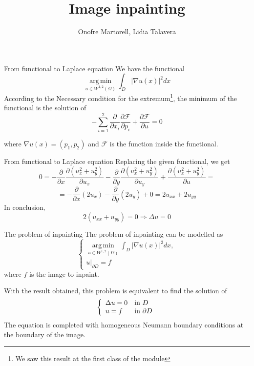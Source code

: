 \documentclass[11pt]{beamer}
\author{Onofre Martorell, Lidia Talavera}
\title{Image inpainting}
\DeclareMathOperator{\argmin}{\mathrm{arg\, min}}
\begin{document}
\begin{frame}
\titlepage
\end{frame}


\begin{frame}{From functional to Laplace equation}
We have the functional
$$
\displaystyle\argmin\limits_{u\in W^{1,2}(\Omega)}\int _D |\nabla u(x)|^2dx
$$
According to the Necessary condition for the extremum\footnote{We saw this result at the first class of the module}, the minimum of the functional is the solution of
$$-\sum_{i=1}^2 \frac{\partial}{\partial x_i}\frac{\partial\mathcal{F}}{\partial p_i} + \frac{\partial\mathcal{F}}{\partial u} = 0$$

where $\nabla u(x) = (p_1, p_2)$ and $\mathcal{F}$ is the function inside the functional.
\end{frame}

\begin{frame}{From functional to Laplace equation}
Replacing the given functional, we get
$$ 0 = - \frac{\partial}{\partial x}\frac{\partial(u_x^2 + u_y^2)}{\partial u_x} - \frac{\partial}{\partial y}\frac{\partial(u_x^2 + u_y^2)}{\partial u_y} + \frac{\partial(u_x^2 + u_y^2)}{\partial u} = $$
$$ = - \frac{\partial}{\partial x}(2u_x) - \frac{\partial}{\partial y}(2u_y) + 0 = 2u_{xx} + 2u_{yy}$$
In conclusion,
$$2(u_{xx} + u_{yy})=0\Longrightarrow \Delta u = 0$$
\end{frame}

\begin{frame}{The problem of inpainting}
The problem of inpainting can be modelled as
$$
\begin{cases}
\displaystyle\argmin\limits_{u\in W^{1,2}(\Omega)}\int _D |\nabla u(x)|^2dx,\\
u|_{\partial D} = f
\end{cases}
$$
where $f$ is the image to inpaint.


With the result obtained, this problem is equivalent to find the solution of
$$\left\lbrace
\begin{array}{l l}

\Delta u = 0& \text{in }D \\
u = f & \text{in }\partial D

\end{array}\right.
$$
The equation is completed with homogeneous Neumann boundary
conditions at the boundary of the image.

\end{frame}
\end{document}
